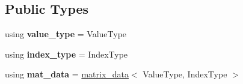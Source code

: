 \subsection*{Public Types}
\begin{DoxyCompactItemize}
\item 
\mbox{\label{classgko_1_1matrix_1_1Csr_ae9e0b5332427a9a5a782aab4b6e2b60e}} 
using {\bfseries value\+\_\+type} = Value\+Type
\item 
\mbox{\label{classgko_1_1matrix_1_1Csr_a47f9c8f2945fc5d50e1eac99a9511174}} 
using {\bfseries index\+\_\+type} = Index\+Type
\item 
\mbox{\label{classgko_1_1matrix_1_1Csr_a4aeffed616fb42844161bd176f588785}} 
using {\bfseries mat\+\_\+data} = \hyperlink{structgko_1_1matrix__data}{matrix\+\_\+data}$<$ Value\+Type, Index\+Type $>$
\end{DoxyCompactItemize}
